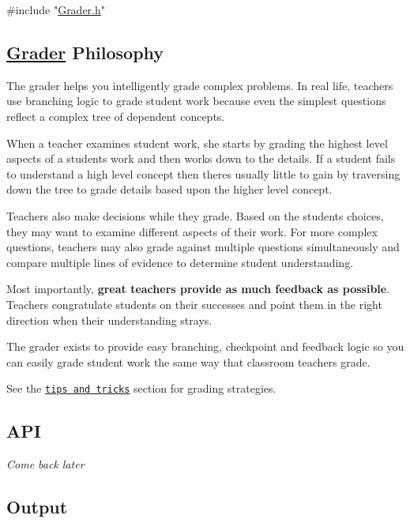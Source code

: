 
\begin{DoxyCode}
\textcolor{preprocessor}{#include "\hyperlink{_grader_8h}{Grader.h}"}
\end{DoxyCode}
 



\subsection*{\hyperlink{class_grader}{Grader} Philosophy}

The grader helps you intelligently grade complex problems. In real life, teachers use branching logic to grade student work because even the simplest questions reflect a complex tree of dependent concepts.

When a teacher examines student work, she starts by grading the highest level aspects of a student\textquotesingle{}s work and then works down to the details. If a student fails to understand a high level concept then there\textquotesingle{}s usually little to gain by traversing down the tree to grade details based upon the higher level concept.

Teachers also make decisions while they grade. Based on the student\textquotesingle{}s choices, they may want to examine different aspects of their work. For more complex questions, teachers may also grade against multiple questions simultaneously and compare multiple lines of evidence to determine student understanding.

Most importantly, {\bfseries great teachers provide as much feedback as possible}. Teachers congratulate students on their successes and point them in the right direction when their understanding strays.

The grader exists to provide easy branching, checkpoint and feedback logic so you can easily grade student work the same way that classroom teachers grade.

See the \href{#tips-n-tricks}{\tt tips and tricks} section for grading strategies.

\subsection*{A\+PI}

{\itshape Come back later}

\subsection*{Output}


